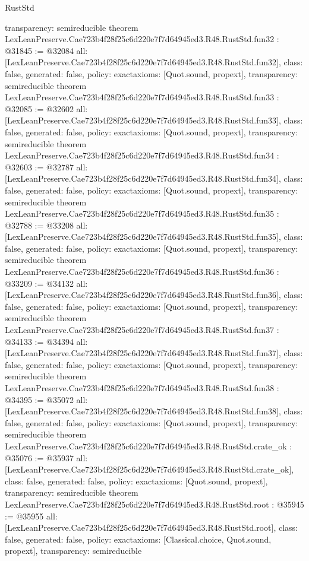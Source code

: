 \begin{lexlean}{RustStd}
\begin{coremodule}
{  transparency: semireducible
}
theorem LexLeanPreserve.Cae723b4f28f25c6d220e7f7d64945ed3.R48.RustStd.fun32 : @31845 := @32084 {
  all: [LexLeanPreserve.Cae723b4f28f25c6d220e7f7d64945ed3.R48.RustStd.fun32],
  class: false,
  generated: false,
  policy: exact{axioms: [Quot.sound, propext]},
  transparency: semireducible
}
theorem LexLeanPreserve.Cae723b4f28f25c6d220e7f7d64945ed3.R48.RustStd.fun33 : @32085 := @32602 {
  all: [LexLeanPreserve.Cae723b4f28f25c6d220e7f7d64945ed3.R48.RustStd.fun33],
  class: false,
  generated: false,
  policy: exact{axioms: [Quot.sound, propext]},
  transparency: semireducible
}
theorem LexLeanPreserve.Cae723b4f28f25c6d220e7f7d64945ed3.R48.RustStd.fun34 : @32603 := @32787 {
  all: [LexLeanPreserve.Cae723b4f28f25c6d220e7f7d64945ed3.R48.RustStd.fun34],
  class: false,
  generated: false,
  policy: exact{axioms: [Quot.sound, propext]},
  transparency: semireducible
}
theorem LexLeanPreserve.Cae723b4f28f25c6d220e7f7d64945ed3.R48.RustStd.fun35 : @32788 := @33208 {
  all: [LexLeanPreserve.Cae723b4f28f25c6d220e7f7d64945ed3.R48.RustStd.fun35],
  class: false,
  generated: false,
  policy: exact{axioms: [Quot.sound, propext]},
  transparency: semireducible
}
theorem LexLeanPreserve.Cae723b4f28f25c6d220e7f7d64945ed3.R48.RustStd.fun36 : @33209 := @34132 {
  all: [LexLeanPreserve.Cae723b4f28f25c6d220e7f7d64945ed3.R48.RustStd.fun36],
  class: false,
  generated: false,
  policy: exact{axioms: [Quot.sound, propext]},
  transparency: semireducible
}
theorem LexLeanPreserve.Cae723b4f28f25c6d220e7f7d64945ed3.R48.RustStd.fun37 : @34133 := @34394 {
  all: [LexLeanPreserve.Cae723b4f28f25c6d220e7f7d64945ed3.R48.RustStd.fun37],
  class: false,
  generated: false,
  policy: exact{axioms: [Quot.sound, propext]},
  transparency: semireducible
}
theorem LexLeanPreserve.Cae723b4f28f25c6d220e7f7d64945ed3.R48.RustStd.fun38 : @34395 := @35072 {
  all: [LexLeanPreserve.Cae723b4f28f25c6d220e7f7d64945ed3.R48.RustStd.fun38],
  class: false,
  generated: false,
  policy: exact{axioms: [Quot.sound, propext]},
  transparency: semireducible
}
theorem LexLeanPreserve.Cae723b4f28f25c6d220e7f7d64945ed3.R48.RustStd.crate_ok : @35076 := @35937 {
  all: [LexLeanPreserve.Cae723b4f28f25c6d220e7f7d64945ed3.R48.RustStd.crate_ok],
  class: false,
  generated: false,
  policy: exact{axioms: [Quot.sound, propext]},
  transparency: semireducible
}
theorem LexLeanPreserve.Cae723b4f28f25c6d220e7f7d64945ed3.R48.RustStd.root : @35945 := @35955 {
  all: [LexLeanPreserve.Cae723b4f28f25c6d220e7f7d64945ed3.R48.RustStd.root],
  class: false,
  generated: false,
  policy: exact{axioms: [Classical.choice, Quot.sound, propext]},
  transparency: semireducible
}


\end{coremodule}
\end{lexlean}
